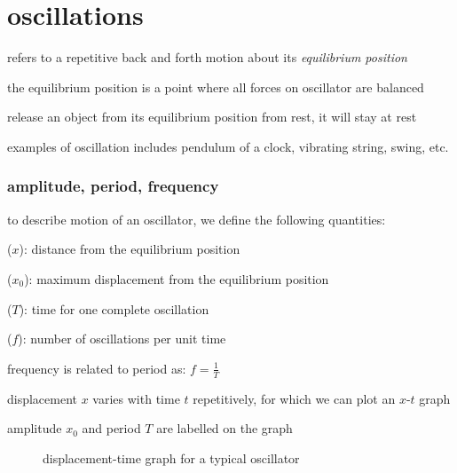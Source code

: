 
\chapter{oscillations}
\begin{ilight}
	 refers to a repetitive back and forth motion about its \emph{equilibrium position}
\end{ilight}

the equilibrium position is a point where all forces on oscillator are balanced

release an object from its equilibrium position from rest, it will stay at rest

examples of oscillation includes pendulum of a clock, vibrating string, swing, etc.


\subsection{amplitude, period, frequency}

to describe motion of an oscillator, we define the following quantities:

\cmt {} ($x$): distance from the equilibrium position

\cmt {} ($x_0$): maximum displacement from the equilibrium position

\cmt {} ($T$): time for one complete oscillation

\cmt {} ($f$): number of oscillations per unit time

frequency is related to period as: ${f=\frac{1}{T}}$

\vspace*{\baselineskip}

displacement $x$ varies with time $t$ repetitively, for which we can plot an $x$-$t$ graph

amplitude $x_0$ and period $T$ are labelled on the graph


\begin{figure}[ht]
\centering
{}

\caption{displacement-time graph for a typical oscillator}
\end{figure}


